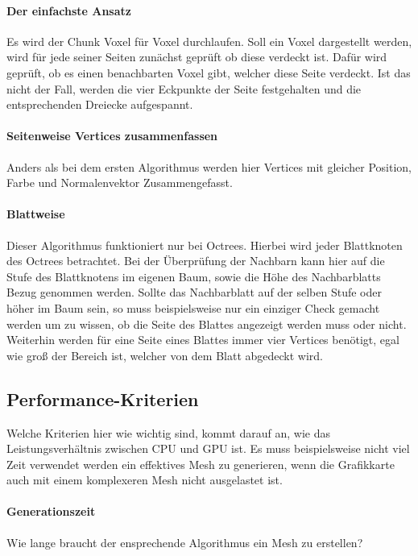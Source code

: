 \documentclass[
a4paper,     %
12pt         %
]{scrartcl}  %
\begin{document}
\paragraph{Der einfachste Ansatz}
Es wird der Chunk Voxel für Voxel durchlaufen. Soll ein Voxel dargestellt werden, wird für jede seiner Seiten zunächst geprüft ob diese verdeckt ist. Dafür wird geprüft, ob es einen benachbarten Voxel gibt, welcher diese Seite verdeckt. Ist das nicht der Fall, werden die vier Eckpunkte der Seite festgehalten und die entsprechenden Dreiecke aufgespannt.

\paragraph{Seitenweise Vertices zusammenfassen}
Anders als bei dem ersten Algorithmus werden hier Vertices mit gleicher Position, Farbe und Normalenvektor Zusammengefasst.

\paragraph{Blattweise}
Dieser Algorithmus funktioniert nur bei Octrees. Hierbei wird jeder Blattknoten des Octrees betrachtet. Bei der Überprüfung der Nachbarn kann hier auf die Stufe des Blattknotens im eigenen Baum, sowie die Höhe des Nachbarblatts Bezug genommen werden. Sollte das Nachbarblatt auf der selben Stufe oder höher im Baum sein, so muss beispielsweise nur ein einziger Check gemacht werden um zu wissen, ob die Seite des Blattes angezeigt werden muss oder nicht. Weiterhin werden für eine Seite eines Blattes immer vier Vertices benötigt, egal wie groß der Bereich ist, welcher von dem Blatt abgedeckt wird.

\subsection{Performance-Kriterien}
Welche Kriterien hier wie wichtig sind, kommt darauf an, wie das Leistungsverhältnis zwischen CPU und GPU ist. Es muss beispielsweise nicht viel Zeit verwendet werden ein effektives Mesh zu generieren, wenn die Grafikkarte auch mit einem komplexeren Mesh nicht ausgelastet ist.

\paragraph{Generationszeit}
Wie lange braucht der ensprechende Algorithmus ein Mesh zu erstellen?
\end{document}

